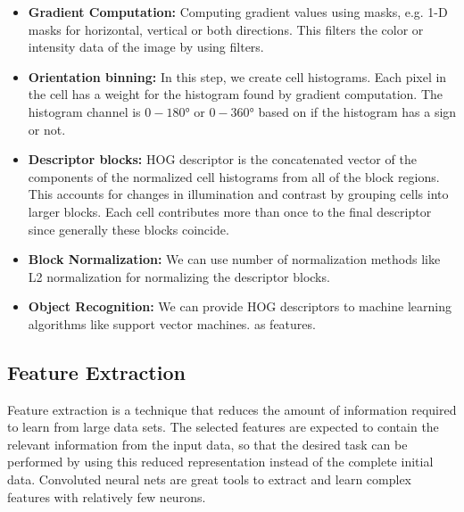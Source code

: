 \documentclass[twoside]{article}
\begin{document}
\begin{itemize}
\item \textbf{Gradient Computation:}
Computing gradient values using masks, e.g. 1-D masks for horizontal, vertical or both directions. This filters the color or intensity data of the image by using filters.

\item \textbf{Orientation binning:} 
In this step, we create cell histograms. Each pixel in the cell has a weight for the histogram found by gradient computation. The histogram channel is $0-\ang{180} $ or $0-\ang{360}$  based on if the histogram has a sign or not.

\item \textbf{Descriptor blocks:}
HOG descriptor is the concatenated vector of the components of the normalized cell histograms from all of the block regions. This accounts for changes in illumination and contrast by grouping cells into larger blocks. Each cell contributes more than once to the final descriptor since generally these blocks coincide.

\item \textbf{Block Normalization:}
We can use number of normalization methods like L2 normalization for normalizing the descriptor blocks.

\item \textbf{Object Recognition:}
We can provide HOG descriptors to machine learning algorithms like support vector machines. as features.

\end{itemize}


\subsection{Feature Extraction}
Feature extraction is a technique that reduces the amount of information required to learn from large data sets. The selected features are expected to contain the relevant information from the input data, so that the desired task can be performed by using this reduced representation instead of the complete initial data. Convoluted neural nets are great tools to extract and learn complex features with relatively few neurons. 



\end{document}
